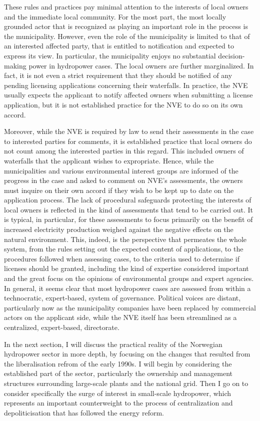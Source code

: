 These rules and practices pay minimal attention to the interests of local owners and the immediate local community. For the most part, the most locally grounded actor that is recognized as playing an important role in the process is the municipality. However, even the role of the municipality is limited to that of an interested affected party, that is entitled to notification and expected to express its  view. In particular, the municipality enjoys no substantial decision-making power in hydropower cases. The local owners are further marginalized. In fact, it is not even a strict requirement that they should be notified of any pending licensing applications concerning their waterfalls. In practice, the NVE usually expects the applicant to notify affected owners when submitting a license application, but it is not established practice for the NVE to do so on its own accord.

Moreover, while the NVE is required by law to send their assessments in the case to interested parties for comments, it is established practice that local owners do not count among the interested parties in this regard. This included owners of waterfalls that the applicant wishes to expropriate. Hence, while the municipalities and various environmental interest groups are informed of the progress in the case and asked to comment on NVE's assessments, the owners must inquire on their own accord if they wish to be kept up to date on the application process. The lack of procedural safeguards protecting the interests of local owners is reflected in the kind of assessments that tend to be carried out. It is typical, in particular, for these assessments to focus primarily on the benefit of increased electricity production weighed against the negative effects on the natural environment. This, indeed, is the perspective that permeates the whole system, from the rules setting out the expected content of applications, to the procedures followed when assessing cases, to the criteria used to determine if licenses should be granted, including the kind of expertise considered important and the great focus on the opinions of environmental groups and expert agencies. In general, it seems clear that most hydropower cases are assessed from within a technocratic, expert-based, system of governance. Political voices are distant, particularly now as the municipality companies have been replaced by commercial actors on the applicant side, while the NVE itself has been streamlined as a centralized, expert-based, directorate.

In the next section, I will discuss the practical reality of the Norwegian hydropower sector in more depth, by focusing on the changes that resulted from the liberalisation refrom of the early 1990s. I will begin by considering the established part of the sector, particularly the ownership and management structures surrounding large-scale plants and the national grid. Then I go on to consider specifically the surge of interest in small-scale hydropower, which represents an important counterweight to the process of centralization and depoliticisation that has followed the energy reform.

